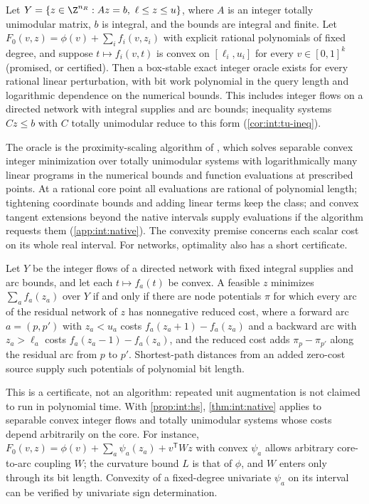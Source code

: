 \begin{proposition}\label{prop:int:hs}
Let $Y=\{z\in\Z^{n_R}:Az=b,\ \ell\le z\le u\}$, where $A$ is an integer
totally unimodular matrix, $b$ is integral, and the bounds are integral and
finite. Let $F_0(v,z)=\phi(v)+\sum_if_i(v,z_i)$ with explicit rational
polynomials of fixed degree, and suppose $t\mapsto f_i(v,t)$ is convex on
$[\ell_i,u_i]$ for every $v\in[0,1]^k$ (promised, or certified). Then a
box-stable exact integer oracle exists for every rational linear perturbation,
with bit work polynomial in the query length and logarithmic dependence on the
numerical bounds. This includes integer flows on a directed network with
integral supplies and arc bounds; inequality systems $Cz\le b$ with $C$ totally
unimodular reduce to this form (\cref{cor:int:tu-ineq}).
\end{proposition}

The oracle is the proximity-scaling algorithm of
\citet[Theorem~4.3]{hochbaum1990-convex-separable-optimization-is-not}, which solves separable convex
integer minimization over totally unimodular systems with logarithmically
many linear programs in the numerical bounds and function evaluations at
prescribed points. At a rational core point all evaluations are rational of
polynomial length; tightening coordinate bounds and adding linear terms keep
the class; and convex tangent extensions beyond the native intervals supply
evaluations if the algorithm requests them
(\cref{app:int:native}). The convexity premise concerns each scalar cost on its
whole real interval. For networks, optimality also has a short certificate.

\begin{lemma}\label{lem:int:potentials}
Let $Y$ be the integer flows of a directed network with fixed integral
supplies and arc bounds, and let each $t\mapsto f_a(t)$ be convex. A feasible
$z$ minimizes $\sum_af_a(z_a)$ over $Y$ if and only if there are node
potentials $\pi$ for which every arc of the residual network of $z$ has
nonnegative reduced cost, where a forward arc $a=(p,p')$ with $z_a<u_a$ costs
$f_a(z_a+1)-f_a(z_a)$ and a backward arc with $z_a>\ell_a$ costs
$f_a(z_a-1)-f_a(z_a)$, and the reduced cost adds $\pi_p-\pi_{p'}$ along the
residual arc from $p$ to $p'$. Shortest-path distances from an added zero-cost
source supply such potentials of polynomial bit length.
\end{lemma}

This is a certificate, not an algorithm: repeated unit augmentation is not
claimed to run in polynomial time. With \cref{prop:int:hs},
\cref{thm:int:native} applies to separable convex integer flows and totally
unimodular systems whose costs depend arbitrarily on the core. For instance,
$F_0(v,z)=\phi(v)+\sum_a\psi_a(z_a)+v^{\mathsf T}Wz$ with convex $\psi_a$ allows
arbitrary core-to-arc coupling $W$; the curvature bound $L$ is that of $\phi$,
and $W$ enters only through its bit length. Convexity of a fixed-degree
univariate $\psi_a$ on its interval can be verified by univariate sign
determination.

